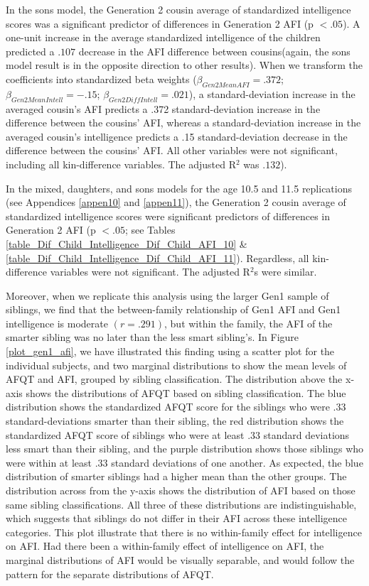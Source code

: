 In the sons model, the Generation 2 cousin average of standardized intelligence scores was a significant predictor of differences in Generation 2 AFI (p $< .05$). A one-unit increase in the average standardized intelligence of the children predicted a $.107$ decrease in the AFI difference between cousins(again, the sons model result is in the opposite direction to other results). When we transform the coefficients into standardized beta weights ($\beta_{Gen2 Mean AFI} = .372$; $\beta_{Gen2 Mean Intell} = -.15$; $\beta_{Gen2 Diff Intell} = .021$), a standard-deviation increase in the averaged cousin's AFI predicts a .372 standard-deviation increase in the difference between the cousins' AFI, whereas a standard-deviation increase in the averaged cousin's intelligence predicts a .15 standard-deviation decrease in the difference between the cousins' AFI. All other variables were not significant, including all kin-difference variables. The adjusted R$^{2}$ was $.132$). 

In the mixed, daughters, and sons models for the age 10.5 and 11.5 replications (see Appendices \ref{appen10} and \ref{appen11}), the Generation 2 cousin average of standardized intelligence scores were significant predictors of differences in Generation 2 AFI (p $< .05$; see Tables \ref{table_Dif_Child_Intelligence_Dif_Child_AFI_10} \& \ref{table_Dif_Child_Intelligence_Dif_Child_AFI_11}). Regardless, all kin-difference variables were not significant. The adjusted R$^{2}$s were similar. 

Moreover, when we replicate this analysis using the larger Gen1 sample of siblings, we find that the between-family relationship of Gen1 AFI and Gen1 intelligence is moderate $(r =.291)$, but within the family, the AFI of the smarter sibling was no later than the less smart sibling's. In Figure \ref{plot_gen1_afi}, we have illustrated this finding using a scatter plot for the individual subjects, and two marginal distributions to show the mean levels of AFQT and AFI, grouped by sibling classification. The distribution above the x-axis shows the distributions of AFQT based on sibling classification. The blue distribution shows the standardized AFQT score for the siblings who were .33 standard-deviations smarter than their sibling, the red distribution shows the standardized AFQT score of siblings who were at least .33 standard deviations less smart than their sibling, and the purple distribution shows those siblings who were within at least .33 standard deviations of one another. As expected, the blue distribution of smarter siblings had a higher mean than the other groups. The distribution across from the y-axis shows the distribution of AFI based on those same sibling classifications. All three of these distributions are indistinguishable, which suggests that siblings do not differ in their AFI across these intelligence categories. This plot illustrate that there is no within-family effect for intelligence on AFI. Had there been a within-family effect of intelligence on AFI, the marginal distributions of AFI would be visually separable, and would follow the pattern for the separate distributions of AFQT.%

